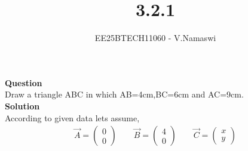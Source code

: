 \documentclass[journal]{IEEEtran}
\begin{document}

\vspace{3cm}

\title{3.2.1}
\author{EE25BTECH11060 - V.Namaswi}
{\let\newpage\relax\maketitle}
\renewcommand{\thefigure}{\theenumi}
\renewcommand{\thetable}{\theenumi}
\setlength{\intextsep}{10pt} %
\textbf{Question}\\Draw a triangle ABC in which AB=4cm,BC=6cm and AC=9cm.\\
\textbf{Solution}\\
According to given data lets assume,\\
\begin{align*}
\vec{A}=\begin{pmatrix}0\\0\end{pmatrix}\qquad 
\vec{B}=\begin{pmatrix}4\\0\end{pmatrix}\qquad 
\vec{C}=\begin{pmatrix}x\\y\end{pmatrix}   
\end{align*}
 
\end{document}
